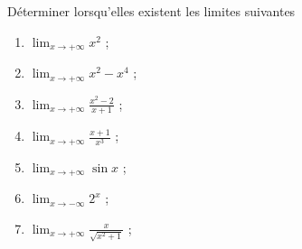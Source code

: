 
\begin{exercice}\label{exoSVT-0001}

    Déterminer lorsqu'elles existent les limites suivantes
    \begin{enumerate}
        \item           
   $\displaystyle \lim_{x\to +\infty}x^2$ ;
   \item 
     $\displaystyle \lim_{x\to +\infty}x^2-x^4$ ;
   \item
    $\displaystyle \lim_{x\to +\infty}\frac{x^2-2}{x+1}$ ;
    \item
      $\displaystyle \lim_{x\to +\infty}\frac{x+1}{x^3}$ ;
      \item
        $\displaystyle \lim_{x\to +\infty}\sin x$ ;
            \item
              $\displaystyle \lim_{x\to -\infty} 2^x$ ;
              \item
                $\displaystyle \lim_{x\to +\infty}\frac{x}{\sqrt{x^2+1}}$ ;

    \end{enumerate}

\end{exercice}
